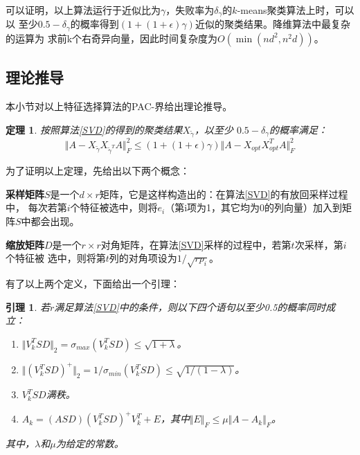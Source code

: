 \documentclass{ctexart}
\begin{document}
    可以证明，以上算法运行于近似比为$\gamma$，失败率为$\delta_\gamma$的$k$-means聚类算法上时，可以以
    至少$0.5-\delta_\gamma$的概率得到$(1+(1+\epsilon)\gamma)$近似的聚类结果。降维算法中最复杂的运算为
    求前k个右奇异向量，因此时间复杂度为$O(\min(nd^2, n^2d))$。

    \subsection{理论推导}
    本小节对以上特征选择算法的PAC-界给出理论推导\cite{boutsidis2009unsupervised,boutsidis2014randomized}。

    \newtheorem{thm}{\bf 定理}[]
    \begin{thm}
    \label{thmsvd}
        按照算法\autoref{SVD}的得到的聚类结果$X_{\tilde{\gamma}}$，以至少
        $0.5-\delta_\gamma$的概率满足：
        $$
            \Vert A - X_{\tilde{\gamma}} X_{\tilde{\gamma}^T} A \Vert_F^2 \leq (1 + ( 1+\epsilon ) \gamma ) \Vert A - X_{opt} X_{opt}^T A \Vert_F^2
        $$
    \end{thm}

    为了证明以上定理，先给出以下两个概念：

    \textbf{采样矩阵}$S$是一个$d \times r$矩阵，它是这样构造出的：在算法\autoref{SVD}的有放回采样过程中，
    每次若第$i$个特征被选中，则将$e_i$（第i项为1，其它均为0的列向量）加入到矩阵$S$中都会出现。

    \textbf{缩放矩阵}$D$是一个$r \times r$对角矩阵，在算法\autoref{SVD}采样的过程中，若第$t$次采样，第$i$个特征被
    选中，则将第$t$列的对角项设为$1 / \sqrt{rp_i}$。

    有了以上两个定义，下面给出一个引理\cite{boutsidis2009unsupervised}：
    \newtheorem{lemma}{\bf 引理}[]
    \begin{lemma}
    \label{lmsvd}
        若$r$满足算法\autoref{SVD}中的条件，则以下四个语句以至少0.5的概率同时成立：
        \begin{enumerate}
            \item $\Vert V_k^T S D \Vert_2 = \sigma_{max}(V_k^T S D) \leq \sqrt{1 + \lambda}$。
            \item $\Vert (V_k^T S D)^+ \Vert_2 = 1 / \sigma_{min}(V_k^T S D) \leq \sqrt{1 / (1 - \lambda)}$。
            \item $V_k^T S D$满秩。
            \item $A_k = (ASD) (V_k^T SD)^+ V_k^T + E$，其中$\Vert E \Vert_F \leq \mu \Vert A - A_k \Vert_F$。
        \end{enumerate}
        其中，$\lambda$和$\mu$为给定的常数\cite{boutsidis2009unsupervised}。
        
    \end{lemma}
\end{document}
